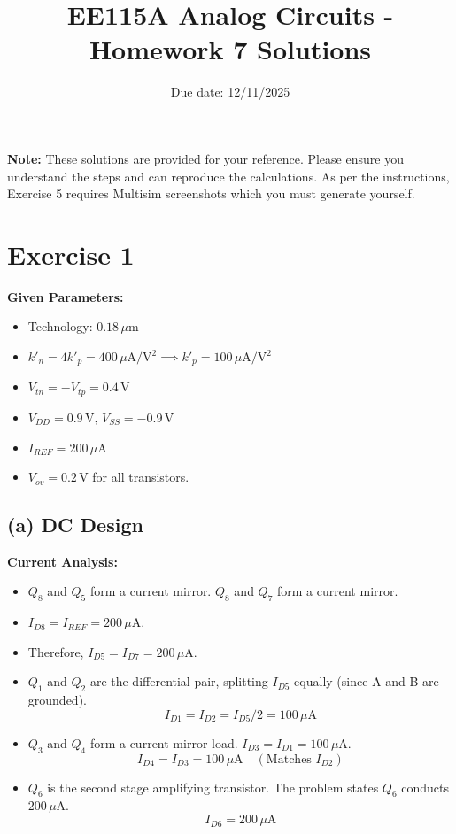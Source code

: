 \documentclass[11pt, a4paper]{article}
\title{EE115A Analog Circuits - Homework 7 Solutions}
\author{}
\date{Due date: 12/11/2025}
\newcommand{\uA}{\,\mu\text{A}}
\begin{document}
\maketitle

\noindent\textbf{Note:} These solutions are provided for your reference. Please ensure you understand the steps and can reproduce the calculations. As per the instructions, Exercise 5 requires Multisim screenshots which you must generate yourself.

\section*{Exercise 1}

\textbf{Given Parameters:}
\begin{itemize}
    \item Technology: $0.18\,\mu\text{m}$
    \item $k'_n = 4k'_p = 400 \uA/\text{V}^2 \implies k'_p = 100 \uA/\text{V}^2$
    \item $V_{tn} = -V_{tp} = 0.4\,\text{V}$
    \item $V_{DD} = 0.9\,\text{V}, \, V_{SS} = -0.9\,\text{V}$
    \item $I_{REF} = 200 \uA$
    \item $V_{ov} = 0.2\,\text{V}$ for all transistors.
\end{itemize}

\subsection*{(a) DC Design}

\textbf{Current Analysis:}
\begin{itemize}
    \item $Q_8$ and $Q_5$ form a current mirror. $Q_8$ and $Q_7$ form a current mirror.
    \item $I_{D8} = I_{REF} = 200 \uA$.
    \item Therefore, $I_{D5} = I_{D7} = 200 \uA$.
    \item $Q_1$ and $Q_2$ are the differential pair, splitting $I_{D5}$ equally (since A and B are grounded).
    \[ I_{D1} = I_{D2} = I_{D5} / 2 = 100 \uA \]
    \item $Q_3$ and $Q_4$ form a current mirror load. $I_{D3} = I_{D1} = 100 \uA$.
    \[ I_{D4} = I_{D3} = 100 \uA \quad (\text{Matches } I_{D2}) \]
    \item $Q_6$ is the second stage amplifying transistor. The problem states $Q_6$ conducts $200 \uA$.
    \[ I_{D6} = 200 \uA \]
\end{itemize}
\end{document}

